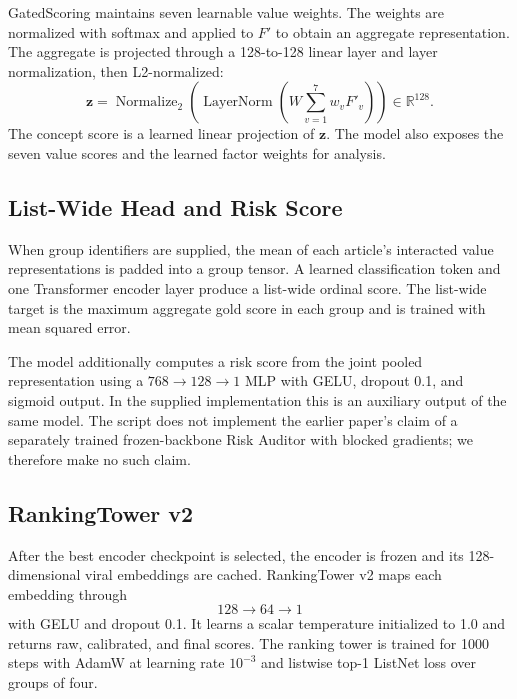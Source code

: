 \documentclass[11pt]{article}
\begin{document}
GatedScoring maintains seven learnable value weights. The weights are normalized with softmax and applied to $F'$ to obtain an aggregate representation. The aggregate is projected through a 128-to-128 linear layer and layer normalization, then L2-normalized:
\begin{equation}
    \mathbf{z}=\operatorname{Normalize}_2\left(\operatorname{LayerNorm}(W\sum_{v=1}^{7}w_vF'_v)\right)
    \in\mathbb{R}^{128}.
\end{equation}
The concept score is a learned linear projection of $\mathbf{z}$. The model also exposes the seven value scores and the learned factor weights for analysis.

\subsection{List-Wide Head and Risk Score}

When group identifiers are supplied, the mean of each article's interacted value representations is padded into a group tensor. A learned classification token and one Transformer encoder layer produce a list-wide ordinal score. The list-wide target is the maximum aggregate gold score in each group and is trained with mean squared error.

The model additionally computes a risk score from the joint pooled representation using a $768\rightarrow128\rightarrow1$ MLP with GELU, dropout 0.1, and sigmoid output. In the supplied implementation this is an auxiliary output of the same model. The script does not implement the earlier paper's claim of a separately trained frozen-backbone Risk Auditor with blocked gradients; we therefore make no such claim.

\subsection{RankingTower v2}

After the best encoder checkpoint is selected, the encoder is frozen and its 128-dimensional viral embeddings are cached. RankingTower v2 maps each embedding through
\begin{equation}
    128\rightarrow64\rightarrow1
\end{equation}
with GELU and dropout 0.1. It learns a scalar temperature initialized to 1.0 and returns raw, calibrated, and final scores. The ranking tower is trained for 1000 steps with AdamW at learning rate $10^{-3}$ and listwise top-1 ListNet loss over groups of four.
\end{document}
